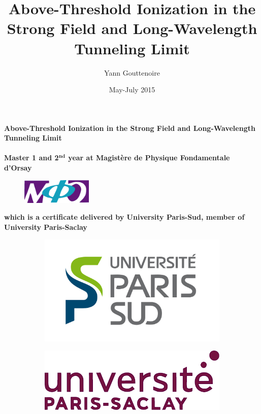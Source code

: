 \documentclass[a4paper]{article}
\title{Above-Threshold Ionization in the Strong Field and Long-Wavelength Tunneling Limit}
\author{Yann Gouttenoire}
\date{May-July 2015}
\begin{document}

\makeatletter

  \begin{titlepage}
  \centering
  {\LARGE \textbf{Above-Threshold Ionization in the Strong Field and Long-Wavelength Tunneling Limit}} \\
      \vspace{1cm}
  {\large \@author} \\
      \vspace{1cm}
  {\textbf{Master 1 and 2$^{\textbf{nd}}$ year at Magist\`ere de Physique Fondamentale d'Orsay}} \\
      \vspace{1cm}
      \begin{figure}[h]
      \centering
    \includegraphics[width=0.30\textwidth]{logo/magistere.pdf}
      \end{figure}
  {\textbf{which is a certificate delivered by University Paris-Sud, member of University Paris-Saclay}} \\ 
        
   \begin{figure}[h]
   \centering
   \begin{subfigure}[l]{0.30\textwidth}
       \includegraphics[width=\textwidth]{logo/upsud}
   \end{subfigure}
   \hfill
   \begin{subfigure}[r]{0.30\textwidth}
       \includegraphics[width=\textwidth]{logo/upsaclay}
   \end{subfigure}
   \end{figure}
        \vfill


\end{titlepage}
\end{document}
